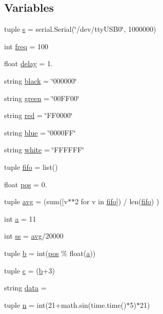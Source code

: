 \subsection*{Variables}
\begin{DoxyCompactItemize}
\item 
tuple \hyperlink{namespacetest__lamp_a2a800f9adfbfa469a4512743d36bd781}{s} = serial.\+Serial(\char`\"{}/dev/tty\+U\+S\+B0\char`\"{}, 1000000)
\item 
int \hyperlink{namespacetest__lamp_a96ed73138b4ac9b56fa6756621f158ae}{freq} = 100
\item 
float \hyperlink{namespacetest__lamp_ae5d1a14ec1ec8e97cf8938be9386e507}{delay} = 1.
\item 
string \hyperlink{namespacetest__lamp_a3fcd0129cd517124f65cc0cb7173ebdd}{black} = \char`\"{}000000\char`\"{}
\item 
string \hyperlink{namespacetest__lamp_a51fd2448d3bc03744f0811a13cbaa0ef}{green} = \char`\"{}00\+F\+F00\char`\"{}
\item 
string \hyperlink{namespacetest__lamp_a1bbf62187c72933bcb170bb50c8566cf}{red} = \char`\"{}F\+F0000\char`\"{}
\item 
string \hyperlink{namespacetest__lamp_a7f447446745812eae2674efdeb1a94ed}{blue} = \char`\"{}0000\+F\+F\char`\"{}
\item 
string \hyperlink{namespacetest__lamp_aa06530574bc0e50eb9bf9cb94cb98d95}{white} = \char`\"{}F\+F\+F\+F\+F\+F\char`\"{}
\item 
tuple \hyperlink{namespacetest__lamp_a3f074fe7b6f4e5692ca115354c4b282f}{fifo} = list()
\item 
float \hyperlink{namespacetest__lamp_a065ccc382a9d2863201219bfa7e22130}{pos} = 0.
\item 
tuple \hyperlink{namespacetest__lamp_a2154c1290fae45d62099a61e2f9a811d}{avg} = (sum(\mbox{[}v$\ast$$\ast$2 for v in \hyperlink{namespacetest__lamp_a3f074fe7b6f4e5692ca115354c4b282f}{fifo}\mbox{]}) / len(\hyperlink{namespacetest__lamp_a3f074fe7b6f4e5692ca115354c4b282f}{fifo}) )
\item 
int \hyperlink{namespacetest__lamp_a2dddcdd03c4015181b84d4e48ef0d678}{a} = 11
\item 
int \hyperlink{namespacetest__lamp_ae1d972cb1f7453e75b2d00c0b8dcddaa}{ss} = \hyperlink{namespacetest__lamp_a2154c1290fae45d62099a61e2f9a811d}{avg}/20000
\item 
tuple \hyperlink{namespacetest__lamp_ad2879a9a1a10baabf94f89a5342c30b4}{b} = int(\hyperlink{namespacetest__lamp_a065ccc382a9d2863201219bfa7e22130}{pos} \% float(\hyperlink{namespacetest__lamp_a2dddcdd03c4015181b84d4e48ef0d678}{a}))
\item 
tuple \hyperlink{namespacetest__lamp_af861b03726bd4fc04350abc65413da17}{c} = (\hyperlink{namespacetest__lamp_ad2879a9a1a10baabf94f89a5342c30b4}{b}+3)
\item 
string \hyperlink{namespacetest__lamp_a3bbaeee85014b3f126907a5f2437d3a5}{data} = \textquotesingle{}\textquotesingle{}
\item 
tuple \hyperlink{namespacetest__lamp_a9b344035322439e65e32b1f0f633b250}{n} = int(21+math.\+sin(time.\+time()$\ast$5)$\ast$21)
\end{DoxyCompactItemize}


